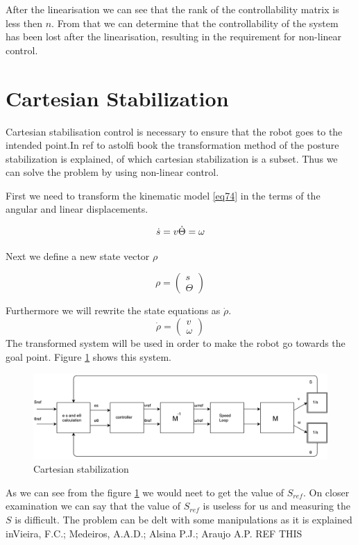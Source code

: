 After the linearisation we can see that the rank of the controllability matrix is less then $n$. From that we can determine that the controllability of the system has been lost after the linearisation, resulting in the requirement for non-linear control.

\section{Cartesian Stabilization}

Cartesian stabilisation control is necessary to ensure that the robot goes to the intended point.In {\color{red}ref to astolfi book} the transformation method of the posture stabilization is explained, of which cartesian stabilization is a subset. Thus we can solve the problem by using non-linear control. 

First we need to transform the kinematic model \ref{eq74} in the terms of the angular and linear displacements.

\begin{equation}
\dot{s}=v\\
\dot{\Theta}=\omega
\end{equation}

Next we define a new state vector $\rho$

\begin{equation}
\rho
=
\begin{pmatrix}
s\\
\Theta
\end{pmatrix}
\end{equation}

Furthermore we will rewrite the state equations as $\dot{\rho}$.
\begin{equation}
\dot{\rho}=
\begin{pmatrix}
v\\
\omega
\end{pmatrix}
\end{equation}
The transformed system will be used in order to make the robot go towards the goal point. Figure \ref{fig:cartesianstab} shows this system.

\begin{figure} 
\centering
 	\includegraphics[width=1\textwidth]{figures/cartesianstab.pdf}
	
	
	\caption{Cartesian stabilization} 
 	\label{fig:cartesianstab} 
\end{figure}

As we can see from the figure \ref{fig:cartesianstab} we would neet to get the value of $S_{ref}$. On closer examination we can say that the value of $S_{ref}$ is useless for us and measuring the $S$ is difficult. The problem can be delt with some manipulations as it is explained in{\color{red}Vieira, F.C.; Medeiros, A.A.D.; Alsina P.J.; Araujo A.P. REF THIS}

